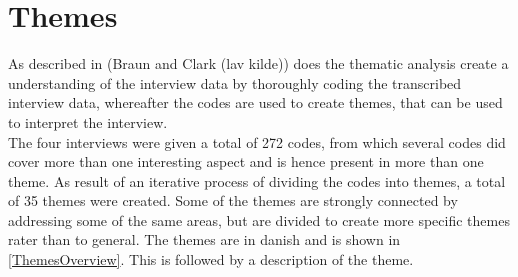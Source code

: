 \section{Themes}
\label{ThematicThemes}
As described in (Braun and Clark (lav kilde)) does the thematic analysis create a understanding of the interview data by thoroughly coding the transcribed interview data, whereafter the codes are used to create themes, that can be used to interpret the interview. \\

The four interviews were given a total of 272 codes, from which several codes did cover more than one interesting aspect and is hence present in more than one theme. As result of an iterative process of dividing the codes into themes, a total of 35 themes were created. Some of the themes are strongly connected by addressing some of the same areas, but are divided to create more specific themes rater than to general. The themes are in danish and is shown in \autoref{ThemesOverview}. This is followed by a description of the theme.



